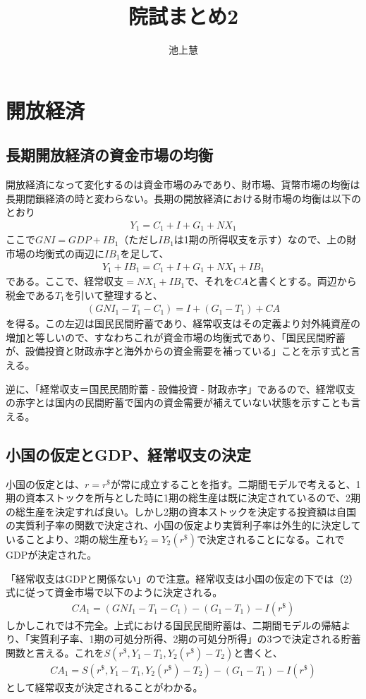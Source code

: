 \documentclass{jsarticle}
\begin{document}
\title{院試まとめ2}
\author{池上慧}
\maketitle

\section{開放経済}
\subsection{長期開放経済の資金市場の均衡}
開放経済になって変化するのは資金市場のみであり、財市場、貨幣市場の均衡は長期閉鎖経済の時と変わらない。長期の開放経済における財市場の均衡は以下のとおり
\begin{align}
	Y_1 = C_1 + I + G_1 + NX_1
\end{align}
ここで$GNI = GDP + IB_1$（ただし$IB_1$は1期の所得収支を示す）なので、上の財市場の均衡式の両辺に$IB_1$を足して、
\begin{align*}
	Y_1 + IB_1 = C_1 + I + G_1 + NX_1 + IB_1
\end{align*}
である。ここで、経常収支$=NX_1 + IB_1$で、それを$CA$と書くとする。両辺から税金である$T_1$を引いて整理すると、
\begin{align}
	(GNI_1 - T_1 -C_1) = I + (G_1 - T_1) + CA
\end{align}
を得る。この左辺は国民民間貯蓄であり、経常収支はその定義より対外純資産の増加と等しいので、すなわちこれが資金市場の均衡式であり、「国民民間貯蓄が、設備投資と財政赤字と海外からの資金需要を補っている」ことを示す式と言える。

逆に、「経常収支＝国民民間貯蓄 - 設備投資 - 財政赤字」であるので、経常収支の赤字とは国内の民間貯蓄で国内の資金需要が補えていない状態を示すことも言える。

\subsection{小国の仮定とGDP、経常収支の決定}
小国の仮定とは、$r = r^{\$}$が常に成立することを指す。二期間モデルで考えると、1期の資本ストックを所与とした時に1期の総生産は既に決定されているので、2期の総生産を決定すれば良い。しかし2期の資本ストックを決定する投資額は自国の実質利子率の関数で決定され、小国の仮定より実質利子率は外生的に決定していることより、2期の総生産も$Y_2 = Y_2(r^{\$})$で決定されることになる。これでGDPが決定された。

「経常収支はGDPと関係ない」ので注意。経常収支は小国の仮定の下では（2）式に従って資金市場で以下のように決定される。
\begin{align*}
	CA_1 = (GNI_1 - T_1 -C_1) - (G_1 - T_1) - I(r^{\$})
\end{align*}
しかしこれでは不完全。上式における国民民間貯蓄は、二期間モデルの帰結より、「実質利子率、1期の可処分所得、2期の可処分所得」の3つで決定される貯蓄関数と言える。これを$S(r^{\$}, Y_1 -T_1, Y_2(r^{\$}) - T_2)$と書くと、
\begin{align*}
	CA_1 = S(r^{\$}, Y_1 -T_1, Y_2(r^{\$}) - T_2) - (G_1 - T_1) - I(r^{\$})
\end{align*}
として経常収支が決定されることがわかる。
\end{document}

